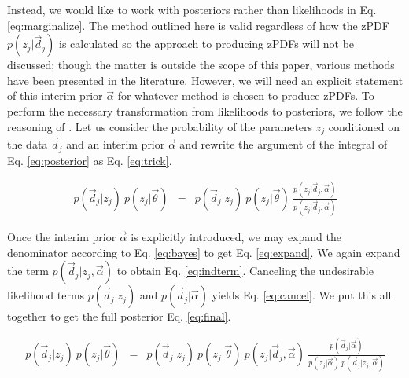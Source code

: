 \documentclass[preprint]{aastex}
\begin{document}
Instead, we would like to work with posteriors rather than likelihoods in Eq. \ref{eq:marginalize}.  The method outlined here is valid regardless of how the zPDF $p(z_{j}|\vec{d}_{j})$ is calculated so the approach to producing zPDFs will not be discussed; though the matter is outside the scope of this paper, various methods have been presented in the literature. \citep{she11, bal08, car13, car14a}  However, we will need an explicit statement of this interim prior $\vec{\alpha}$ for whatever method is chosen to produce zPDFs.  To perform the necessary transformation from likelihoods to posteriors, we follow the reasoning of \citet{mar15}.  Let us consider the probability of the parameters $z_{j}$ conditioned on the data $\vec{d}_{j}$ and an interim prior $\vec{\alpha}$ and rewrite the argument of the integral of Eq. \ref{eq:posterior} as Eq. \ref{eq:trick}.  

\begin{eqnarray}
\label{eq:trick}
p(\vec{d}_{j}|z_{j})\ p(z_{j}|\vec{\theta}) &=& p(\vec{d}_{j}|z_{j})\ p(z_{j}|\vec{\theta})\ \frac{p(z_{j}|\vec{d}_{j},\vec{\alpha})}{p(z_{j}|\vec{d}_{j},\vec{\alpha})}
\end{eqnarray}

Once the interim prior $\vec{\alpha}$ is explicitly introduced, we may expand the denominator according to Eq. \ref{eq:bayes} to get Eq. \ref{eq:expand}.  We again expand the term $p(\vec{d}_{j}|z_{j},\vec{\alpha})$ to obtain Eq. \ref{eq:indterm}.  Canceling the undesirable likelihood terms $p(\vec{d}_{j}|z_{j})$ and $p(\vec{d}_{j}|\vec{\alpha})$ yields Eq. \ref{eq:cancel}.  We put this all together to get the full posterior Eq. \ref{eq:final}.

\begin{eqnarray}
\label{eq:expand}
p(\vec{d}_{j}|z_{j})\ p(z_{j}|\vec{\theta}) &=& p(\vec{d}_{j}|z_{j})\ p(z_{j}|\vec{\theta})\ p(z_{j}|\vec{d}_{j},\vec{\alpha})\ \frac{p(\vec{d}_{j}|\vec{\alpha})}{p(z_{j}|\vec{\alpha})\ p(\vec{d}_{j}|z_{j},\vec{\alpha})}
\end{eqnarray}
\end{document}
